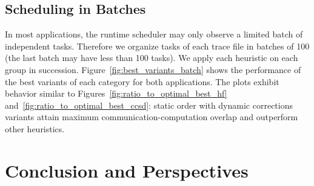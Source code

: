 \documentclass[runningheads]{llncs} %
\begin{document}
	\subsection{Scheduling in Batches}
		In most applications, the runtime scheduler may only observe a limited batch of independent tasks. Therefore we organize tasks of each trace file in batches of 100 (the last batch may have less than 100 tasks). We apply each heuristic on each group in succession. Figure~\ref{fig:best_variants_batch} shows the performance of the best variants of each category for both applications. The plots exhibit behavior similar to Figures~\ref{fig:ratio_to_optimal_best_hf} and~\ref{fig:ratio_to_optimal_best_ccsd}: static order with dynamic corrections variants attain maximum communication-computation overlap and outperform other heuristics.
	
	
	
	\section{Conclusion and Perspectives}
	\label{sec:conclusion}
	
	
\end{document}
